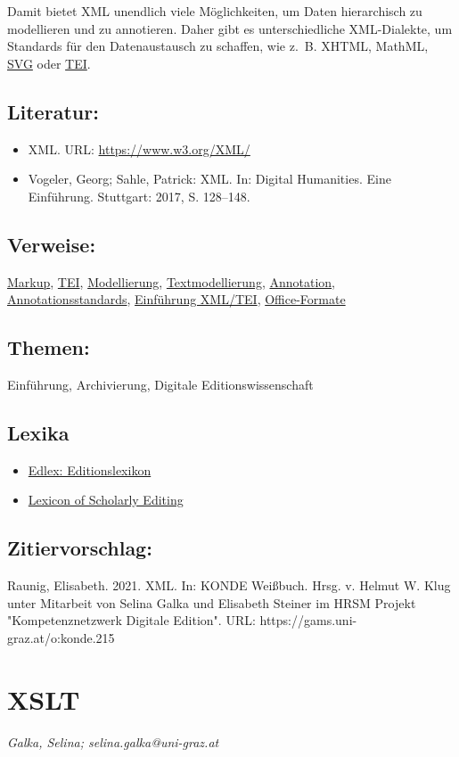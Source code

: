 \documentclass{article}
\begin{document}
        Damit bietet XML unendlich viele Möglichkeiten, um Daten hierarchisch zu
                  modellieren und zu annotieren. Daher gibt es unterschiedliche XML-Dialekte, um
                  Standards für den Datenaustausch zu schaffen, wie z. B. XHTML, MathML, \href{http://gams.uni-graz.at/o:konde.125}{SVG} oder \href{http://gams.uni-graz.at/o:konde.178}{TEI}.\\
            
        \subsection*{Literatur:}\begin{itemize}\item XML. URL: \url{https://www.w3.org/XML/}\item Vogeler, Georg; Sahle, Patrick: XML. In: Digital Humanities. Eine Einführung. Stuttgart: 2017, S. 128–148.\end{itemize}\subsection*{Verweise:}\href{https://gams.uni-graz.at/o:konde.126}{Markup}, \href{https://gams.uni-graz.at/o:konde.178}{TEI}, \href{https://gams.uni-graz.at/o:konde.137}{Modellierung}, \href{https://gams.uni-graz.at/o:konde.195}{Textmodellierung}, \href{https://gams.uni-graz.at/o:konde.17}{Annotation}, \href{https://gams.uni-graz.at/o:konde.29}{Annotationsstandards}, \href{https://gams.uni-graz.at/o:konde.79}{Einführung XML/TEI}, \href{https://gams.uni-graz.at/o:konde.120}{Office-Formate}\subsection*{Themen:}Einführung, Archivierung, Digitale Editionswissenschaft\subsection*{Lexika}\begin{itemize}\item \href{https://edlex.de/index.php?title=Extensible_Markup_Language_(XML)}{Edlex: Editionslexikon}\item \href{https://lexiconse.uantwerpen.be/index.php/lexicon/xml/}{Lexicon of Scholarly Editing}\end{itemize}\subsection*{Zitiervorschlag:}Raunig, Elisabeth. 2021. XML. In: KONDE Weißbuch. Hrsg. v. Helmut W. Klug unter Mitarbeit von Selina Galka und Elisabeth Steiner im HRSM Projekt "Kompetenznetzwerk Digitale Edition". URL: https://gams.uni-graz.at/o:konde.215\newpage\section*{XSLT} \emph{Galka, Selina; selina.galka@uni-graz.at }\\
        
\end{document}
